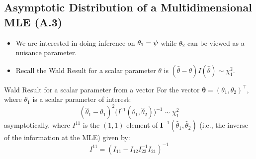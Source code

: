 \documentclass[oneside]{book}\usepackage[]{graphicx}\usepackage[svgnames]{xcolor}
\let\log\relax%
\providecommand{\Vector}[1]{\bm{#1}}%
\providecommand{\Matrix}[1]{\bm{#1}}
\begin{document}
\subsection*{Asymptotic Distribution of a Multidimensional MLE (A.3)}
\begin{itemize}
    \item We are interested in doing inference on $ \theta_1=\log{\psi} $ while $ \theta_2 $ can be viewed as a nuisance parameter.
    \item Recall the Wald Result for a scalar parameter $ \theta $ is $ (\hat{\theta}-\theta)I(\hat{\theta}) \sim \chi^2_1 $.
\end{itemize}
\begin{Regular}{Wald Result for a scalar parameter from a vector}
    For the vector $ \Vector{\theta}=(\theta_1,\theta_2)^\top $, where $ \theta_1 $ is a scalar parameter of interest:
    \[ (\hat{\theta}_1-\theta_1)^2\bigl(I^{11}(\hat{\theta}_1,\hat{\theta}_2)\bigr)^{-1} \sim \chi^2_1 \]
    asymptotically, where $ I^{11} $ is the $ (1,1) $ element of $ \Matrix{I}^{-1}(\hat{\theta}_1,\hat{\theta}_2) $ (i.e., the inverse of the information at the MLE)
    given by:
    \[ I^{11}=(I_{11}-I_{12}I_{22}^{-1}I_{21})^{-1} \]
\end{Regular}
\end{document}

